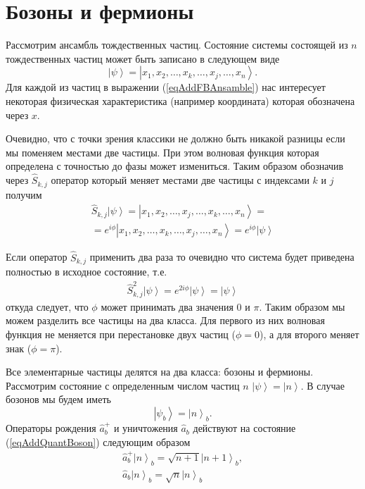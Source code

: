 \section{Бозоны и фермионы}
\label{AddFermionBoson}

Рассмотрим ансамбль тождественных частиц. Состояние системы состоящей
из $n$ тождественных частиц может быть записано в следующем виде
\begin{equation}
  \left|\psi\right> = \left|x_1, x_2, \dots, x_k, \dots, x_j, \dots,
  x_n\right>.
  \label{eqAddFBAnsamble}
\end{equation}
Для каждой из частиц в выражении (\ref{eqAddFBAnsamble}) нас
интересует некоторая физическая характеристика (например координата)
которая обозначена через $x$.

Очевидно, что с точки зрения
классики не должно быть никакой разницы если мы поменяем местами две
частицы. При этом волновая функция которая определена с точностью до
фазы может измениться. Таким образом обозначив через
$\hat{S}_{k,j}$ оператор который меняет местами две частицы с
индексами $k$ и $j$ получим 
\begin{eqnarray}
  \hat{S}_{k, j} \left|\psi\right> = \left|x_1, x_2, \dots, x_j,
  \dots, x_k, \dots,  x_n\right> =
  \nonumber \\
  = e^{i \phi} \left|x_1, x_2, \dots, x_k, \dots, x_j, \dots,
  x_n\right> = e^{i \phi} \left|\psi\right>
  \nonumber
\end{eqnarray}

Если оператор $\hat{S}_{k,j}$ применить два раза то очевидно что
система будет приведена полностью в исходное состояние, т.е.
\begin{eqnarray}
  \hat{S}_{k, j}^2 \left|\psi\right> =
  e^{2 i \phi} \left|\psi\right> = \left|\psi\right>
  \nonumber
\end{eqnarray}
откуда следует, что $\phi$ может принимать два значения $0$ и $\pi$.
Таким образом мы можем разделить все частицы на два класса. Для
первого из них волновая функция не меняется при перестановке двух
частиц ($\phi = 0$), а для второго меняет знак ($\phi = \pi$).


Все элементарные частицы делятся на два класса: бозоны и
фермионы. Рассмотрим состояние с определенным числом частиц $n$
$\left|\psi\right> = \left|n\right>$. В случае бозонов мы будем иметь 
\begin{equation}
\left|\psi_b\right> = \left|n\right>_b.
\label{eqAddQuantBoson}
\end{equation}
Операторы рождения $\hat{a}_b^{+}$ и уничтожения $\hat{a}_b$ действуют на
состояние (\ref{eqAddQuantBoson}) следующим образом
\begin{eqnarray}
\hat{a}_b^{+}\left|n\right>_b = \sqrt{n+1}\left|n+1\right>_b, 
\nonumber \\
\hat{a}_b\left|n\right>_b = \sqrt{n}\left|n\right>_b
\nonumber
\end{eqnarray}

